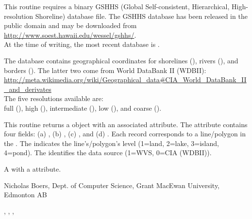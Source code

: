 \documentclass[letterpaper]{book}
\begin{document}
\begin{Details}\relax
This routine requires a binary GSHHS (Global Self-consistent,
Hierarchical, High-resolution Shoreline) database file. The GSHHS
database has been released in the public domain and may be downloaded
from \\{} \url{http://www.soest.hawaii.edu/wessel/gshhs/}. \\{}  At the time of
writing, the most recent database is .

The database  contains geographical coordinates for 
shorelines (), rivers (), and borders ().
The latter two come from World DataBank II (WDBII): \\{}
\url{http://meta.wikimedia.org/wiki/Geographical_data#CIA_World_DataBank_II_and_derivates} \\{}
The five resolutions available are: \\{}
full (), high (), intermediate (), low (), and coarse ().

This routine returns a  object with an associated
 attribute. The attribute contains four fields: (a)
, (b) , (c) , and (d) .
Each record corresponds to a line/polygon in the .  The
 indicates the line's/polygon's level (1=land, 2=lake,
3=island, 4=pond). The  identifies the data source
(1=WVS, 0=CIA (WDBII)).
\end{Details}
%
\begin{Value}
A  with a  attribute.
\end{Value}
%
\begin{Author}\relax
Nicholas Boers, Dept. of Computer Science, Grant MacEwan University, Edmonton AB
\end{Author}
%
\begin{SeeAlso}\relax
{}, , 
,  
\end{SeeAlso}
%
\end{document}
